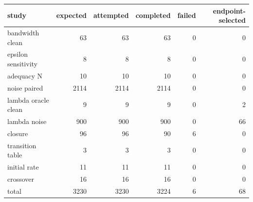 \begin{tabular}{lrrrrr}
\toprule
study & expected & attempted & completed & failed & endpoint-selected \\
\midrule
bandwidth clean & 63 & 63 & 63 & 0 & 0 \\
epsilon sensitivity & 8 & 8 & 8 & 0 & 0 \\
adequacy N & 10 & 10 & 10 & 0 & 0 \\
noise paired & 2114 & 2114 & 2114 & 0 & 0 \\
lambda oracle clean & 9 & 9 & 9 & 0 & 2 \\
lambda noise & 900 & 900 & 900 & 0 & 66 \\
closure & 96 & 96 & 90 & 6 & 0 \\
transition table & 3 & 3 & 3 & 0 & 0 \\
initial rate & 11 & 11 & 11 & 0 & 0 \\
crossover & 16 & 16 & 16 & 0 & 0 \\
total & 3230 & 3230 & 3224 & 6 & 68 \\
\bottomrule
\end{tabular}

